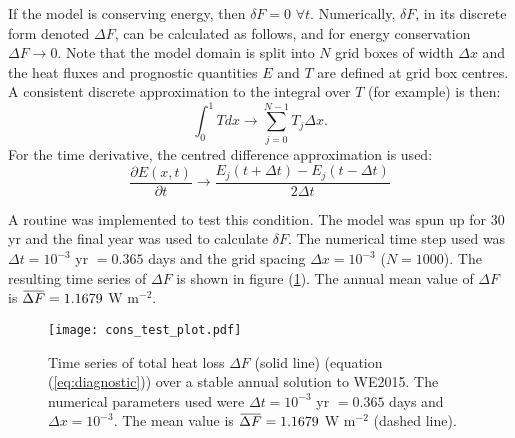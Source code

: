 \documentclass[12pt]{article}
\newcommand{\overbar}[1]{\mkern 1.5mu\overline{\mkern-1.5mu#1\mkern-1.5mu}\mkern 1.5mu}
\begin{document}
If the model is conserving energy, then $\delta F = 0$ $\forall t$. Numerically, $\delta F$, in its discrete form denoted $\Delta F$, can be calculated as follows, and for energy conservation $\Delta F \rightarrow 0$. Note that the model domain is split into $N$ grid boxes of width $\Delta x$ and the heat fluxes and prognostic quantities $E$ and $T$ are defined at grid box centres. A consistent discrete approximation to the integral over $T$ (for example) is then:
\begin{equation}
\int_0^1 Tdx \rightarrow \sum_{j=0}^{N-1}T_j\Delta x.
\end{equation}
For the time derivative, the centred difference approximation is used:
\begin{equation}
\frac{\partial E(x,t)}{\partial t} \rightarrow \frac{E_j(t+\Delta t) - E_j(t-\Delta t)}{2\Delta t}
\end{equation}

A routine was implemented to test this condition. The model was spun up for $30$ yr and the final year was used to calculate $\delta F$. The numerical time step used was $\Delta t = 10^{-3}$ yr $= 0.365$ days and the grid spacing $\Delta x = 10^{-3}$ ($N=1000$). The resulting time series of $\Delta F$ is shown in figure (\ref{fig:cons_test_plot}). The annual mean value of $\Delta F$ is $\overbar{\Delta F} = 1.1679$ W m$^{-2}$.

\begin{figure}[b]
\centering
\texttt{[image: cons\_test\_plot.pdf]}
\caption{Time series of total heat loss $\Delta F$ (solid line) (equation (\ref{eq:diagnostic})) over a stable annual solution to WE2015. The numerical parameters used were $\Delta t = 10^{-3}$ yr $= 0.365$ days and $\Delta x = 10^{-3}$. The mean value is $\overbar{\Delta F} = 1.1679$ W m$^{-2}$ (dashed line). }
\label{fig:cons_test_plot}
\end{figure}
\end{document}
